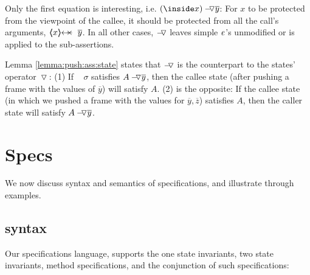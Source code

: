 Only the first equation is interesting, i.e.  $\PushAS y {(\inside x)}$: For 
$x$ to be protected from the viewpoint of the callee, it should be protected from all the call's arguments,
\ie  $\protectedFrom x {\overline {y}}$. 
In all other cases,   $\pushSymbolAA$  leaves simple $\re$'s unmodified %
 or is applied to the sub-assertions. %


\newcommand{\sigmas}{\widetilde \sigma}



\vspace{.1cm}

 Lemma \ref{lemma:push:ass:state}  states that $\pushSymbolAA$ is the counterpart to the states' operator $\pushSymbol$:
 (1) If \ %
$\sigma$ satisfies  $\PushAS y A$, then   { the callee state (after pushing a frame with the values of $\overline y$) 
will satisfy $A$}. %
(2) is the opposite: {If the callee state (in which we pushed a frame with the values for $\overline y, \overline z$) satisfies $A$, then the
caller state will satisfy 
$\PushAS {y} {A}$. } %

\section{Specs}
We  now discuss   syntax and semantics of \SpecLang specifications, and illustrate through examples.

\subsection{\SpecLang syntax }

Our specifications language, %
 supports the one state invariants, two state invariants,  method specifications, and the conjunction of such specifications:
 
